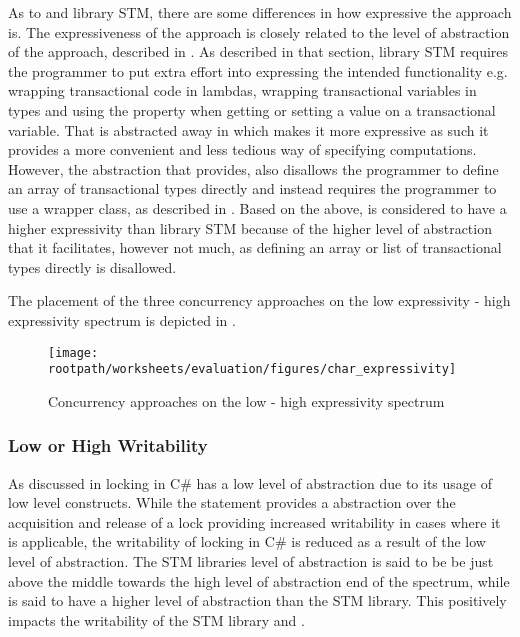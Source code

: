 As to \stmname and library \ac{STM}, there are some differences in how expressive the approach is. The expressiveness of the approach is closely related to the level of abstraction of the approach, described in . As described in that section, library \ac{STM} requires the programmer to put extra effort into expressing the intended functionality e.g. wrapping transactional code in lambdas, wrapping transactional variables in  types and using the  property when getting or setting a value on a transactional variable. That is abstracted away in \stmname which makes it more expressive as such it provides a more convenient and less tedious way of specifying computations. However, the abstraction that \stmname provides, also disallows the programmer to define an array of transactional types directly and instead requires the programmer to use a wrapper class, as described in . Based on the above, \stmname is considered to have a higher expressivity than library \ac{STM} because of the higher level of abstraction that it facilitates, however not much, as defining an array or list of transactional types directly is disallowed.

The placement of the three concurrency approaches on the low expressivity - high expressivity spectrum is depicted in . 

\begin{figure}[htbp]
\centering
 \texttt{[image: \\rootpath/worksheets/evaluation/figures/char\_expressivity]} 
 \caption{Concurrency approaches on the low - high expressivity spectrum}
\label{fig:char_expressivity}
\end{figure}

\subsubsection{Low or High Writability}
As discussed in  locking in C\# has a low level of abstraction due to its usage of low level constructs. While the  statement provides a abstraction over the acquisition and release of a lock providing increased writability in cases where it is applicable, the writability of locking in C\# is reduced as a result of the low level of abstraction. The \ac{STM} libraries level of abstraction is said to be be just above the middle towards the high level of abstraction end of the spectrum, while \stmname is said to have a higher level of abstraction than the \ac{STM} library. This positively impacts the writability of the \ac{STM} library and \stmname.

